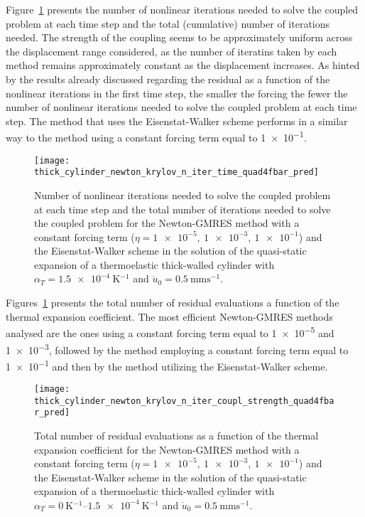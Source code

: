 Figure~\ref{fig:thick_cylinder_newton_krylov_n_iter_time_quad4fbar_pred} presents the number of nonlinear iterations needed to solve the coupled problem at each time step and the total (cumulative) number of iterations needed.
The strength of the coupling seems to be approximately uniform across the displacement range considered, as the number of iteratins taken by each method remains approximately constant as the displacement increases.
As hinted by the results already discussed regarding the residual as a function of the nonlinear iterations in the first time step, the smaller the forcing the fewer the number of nonlinear iterations needed to solve the coupled problem at each time step.
The method that uses the Eisenstat-Walker scheme performs in a similar way to the method using a constant forcing term equal to \num{1e-1}.

\begin{figure}
  \centering
  \texttt{[image: thick\_cylinder\_newton\_krylov\_n\_iter\_time\_quad4fbar\_pred]}
  \caption{Number of nonlinear iterations needed to solve the coupled problem at each time step and the total number of iterations needed to solve the coupled problem for the Newton-GMRES method with a constant forcing term (\(\eta=\num{1e-5},\ \num{1e-3},\ \num{1e-1}\)) and the Eisenstat-Walker scheme in the solution of the quasi-static expansion of a thermoelastic thick-walled cylinder with \(\alpha_T=\SI{1.5e-4}{\kelvin^{-1}}\) and \(\dot u_0 =\SI{0.5}{\milli\meter\second^{-1}}\).}
\label{fig:thick_cylinder_newton_krylov_n_iter_time_quad4fbar_pred}
\end{figure}

Figures~\ref{fig:thick_cylinder_newton_krylov_n_iter_time_quad4fbar_pred} presents the total number of residual evaluations a function of the thermal expansion coefficient.
The most efficient Newton-GMRES methods analysed are the ones using a constant forcing term equal to \num{1e-5} and \num{1e-3}, followed by the method employing a constant forcing term equal to \num{1e-1} and then by the method utilizing the Eisenstat-Walker scheme.

\begin{figure}
  \centering
  \texttt{[image: thick\_cylinder\_newton\_krylov\_n\_iter\_coupl\_strength\_quad4fbar\_pred]}
  \caption{Total number of residual evaluations as a function of the thermal expansion coefficient for the Newton-GMRES method with a constant forcing term (\(\eta=\num{1e-5},\ \num{1e-3},\ \num{1e-1}\)) and the Eisenstat-Walker scheme in the solution of the quasi-static expansion of a thermoelastic thick-walled cylinder with \(\alpha_T=\SIrange{0}{1.5e-4}{\kelvin^{-1}}\) and \(\dot u_0 =\SI{0.5}{\milli\meter\second^{-1}}\).}
\label{fig:thick_cylinder_newton_krylov_n_iter_coupl_strength_quad4fbar_pred}
\end{figure}

